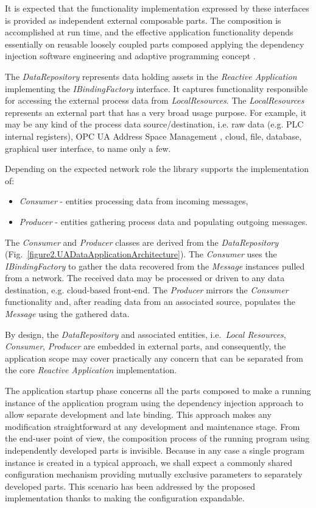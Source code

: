 \documentclass{article}
\begin{document}
It is expected that the functionality implementation expressed by these interfaces is provided as independent external composable parts. The composition is accomplished at run time, and the effective application functionality depends essentially on reusable loosely coupled parts composed applying the dependency injection software engineering and adaptive programming concept \cite{RefWorks:doc:5d9796cbe4b0f66c52dccf04}.

The \emph{DataRepository} represents data holding assets in the \emph{Reactive Application} implementing the \emph{IBindingFactory} interface. It captures functionality responsible for accessing the external process data from \emph{LocalResources}. The \emph{LocalResources} represents an external part that has a very broad usage purpose. For example, it may be any kind of the process data source/destination, i.e. raw data (e.g. PLC internal registers), OPC UA Address Space Management \cite{mpostol2020}, cloud, file, database, graphical user interface, to name only a few.

Depending on the expected network role the library supports the implementation of:

\begin{itemize}
      \item \emph{Consumer} - entities processing data from incoming messages,
      \item \emph{Producer} - entities gathering process data and populating outgoing messages.
\end{itemize}

The \emph{Consumer} and \emph{Producer} classes are derived from the \emph{DataRepository} (Fig.~\ref{figure2.UADataApplicationArchitecture}). The \emph{Consumer} uses the \emph{IBindingFactory} to gather the data recovered from the \emph{Message} instances pulled from a network. The received data may be processed or driven to any data destination, e.g. cloud-based front-end. The \emph{Producer} mirrors the \emph{Consumer} functionality and, after reading data from an associated source, populates the \emph{Message} using the gathered data.

By design, the \emph{DataRepository} and associated entities, i.e.~\emph{Local Resources}, \emph{Consumer}, \emph{Producer} are embedded in external parts, and consequently, the application scope may cover practically any concern that can be separated from the core \emph{Reactive Application} implementation.

The application startup phase concerns all the parts composed to make a running instance of the application program using the dependency injection approach to allow separate development and late binding. This approach makes any modification straightforward at any development and maintenance stage. From the end-user point of view, the composition process of the running program using independently developed parts is invisible. Because in any case a single program instance is created in a typical approach, we shall expect a commonly shared configuration mechanism providing mutually exclusive parameters to separately developed parts. This scenario has been addressed by the proposed implementation thanks to making the configuration expandable.
\end{document}

